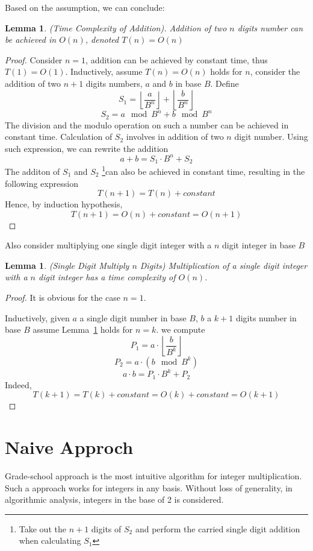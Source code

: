 \documentclass[12pt,a4paper]{amsart}
\numberwithin{equation}{section}
\theoremstyle{plain}
\newtheorem{Lemma}[Th]{Lemma}
\theoremstyle{definition}
\begin{document}
Based on the assumption, we can conclude:
\begin{Lemma} \label{comp_addition} (Time Complexity of Addition).
    Addition of two $n$ digits number can be achieved in $O(n)$, denoted $T(n) = O(n)$
\end{Lemma}
\begin{proof}
    Consider $n = 1$, addition can be achieved by constant time, thus $T(1) = O(1)$.
    Inductively, assume $T(n) = O(n)$ holds for $n$, consider
    the addition of two $n + 1$ digits numbers, $a$ and $b$ in base $B$.
    Define $$S_1 = \left\lfloor\frac{a}{B^{n}}\right\rfloor + \left\lfloor\frac{b}{B^{n}}\right\rfloor$$ $$S_2 = a \mod B^{n} + b \mod B^{n}$$
    The division and the modulo operation on such a number can
    be achieved in constant time. Calculation of $S_2$ involves in addition
    of two $n$ digit number. Using such expression,
    we can rewrite the addition
    $$ a + b = S_1 \cdot B^n + S_2 $$
    The additon of $S_1$ and $S_2$ \footnote{Take out the $n+1$ digits of $S_2$ and perform the carried single digit addition when calculating $S_1$}can also be achieved in constant time, resulting
    in the following expression
    $$ T(n + 1) = T(n) + constant $$
    Hence, by induction hypothesis,
    $$ T(n + 1) = O(n) + constant = O(n + 1) $$
\end{proof}
Also consider multiplying one single digit integer with a $n$ digit integer in base $B$
\begin{Lemma} \label{comp_single_digit_mul} (Single Digit Multiply $n$ Digits)
    Multiplication of a single digit integer with a $n$ digit integer has a time complexity
    of $O(n)$.
\end{Lemma}
\begin{proof}
    It is obvious for the case $n = 1$.

    Inductively, given $a$ a single digit number in base $B$,
    $b$ a $k + 1$ digits number in base $B$
    assume Lemma~\ref{comp_single_digit_mul} holds for $n = k$. 
    we compute
    $$ P_1 = a \cdot \left\lfloor\frac{b}{B^k}\right\rfloor $$
    $$ P_2 = a \cdot (b \mod B^k) $$
    $$ a \cdot b = P_1 \cdot B^k + P_2 $$
    Indeed, $$T(k + 1) = T(k) + constant = O(k) + constant = O(k + 1)$$
\end{proof}
\section{Naive Approch}
Grade-school approach is the most intuitive algorithm for
integer multiplication. Such a approach works for integers in
any basis. Without loss of generality, in algorithmic analysis, integers in the base of 2 is
considered.
\end{document}
